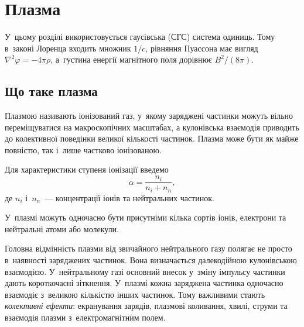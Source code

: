 


\chapter{Плазма}\label{\currfilebase}\hypertarget{Plasma}{}
\graphicspath{{\currfilebase/Pictures}}

У~цьому розділі використовується гаусівська (СГС) система одиниць. Тому в~законі Лоренца входить множник $1/c$, рівняння Пуассона має вигляд $\nabla^2\varphi=-4\pi\rho$, а~густина енергії магнітного поля дорівнює $B^2/(8\pi)$.




\section{Що таке плазма}



Плазмою називають іонізований газ, у~якому заряджені частинки можуть вільно переміщуватися на макроскопічних масштабах, а кулонівська взаємодія приводить до колективної поведінки великої кількості частинок. Плазма може бути як майже повністю, так і~лише частково іонізованою.

Для характеристики ступеня іонізації введемо
\begin{equation}
	\alpha = \frac{n_i}{n_i+n_n},
\end{equation}
де $n_i$ і~$n_n$~--- концентрації іонів та нейтральних частинок.

У~плазмі можуть одночасно бути присутніми кілька сортів іонів, електрони та нейтральні атоми або молекули.

\medskip

Головна відмінність плазми від звичайного нейтрального газу полягає не просто в~наявності заряджених частинок. Вона визначається далекодійною кулонівською взаємодією. У~нейтральному газі основний внесок у~зміну імпульсу частинки дають короткочасні зіткнення. У~плазмі кожна заряджена частинка одночасно взаємодіє з~великою кількістю інших частинок. Тому важливими стають \emph{колективні ефекти}: екранування зарядів, плазмові коливання, хвилі, струми та взаємодія плазми з~електромагнітним полем.

